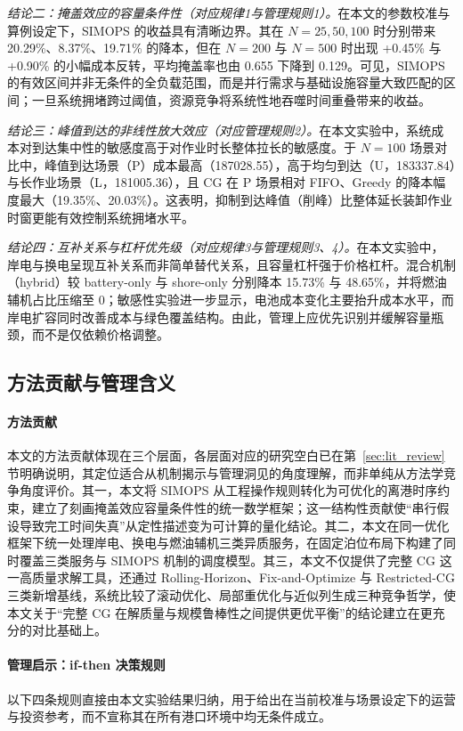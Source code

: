 \documentclass[UTF8, a4paper, 12pt]{ctexart}
\theoremstyle{plain}
\theoremstyle{definition}
\theoremstyle{remark}
\begin{document}
\emph{结论二：掩盖效应的容量条件性（对应规律1与管理规则1）。}在本文的参数校准与算例设定下，SIMOPS 的收益具有清晰边界。其在 $N=25,50,100$ 时分别带来 20.29\%、8.37\%、19.71\% 的降本，但在 $N=200$ 与 $N=500$ 时出现 +0.45\% 与 +0.90\% 的小幅成本反转，平均掩盖率也由 0.655 下降到 0.129。可见，SIMOPS 的有效区间并非无条件的全负载范围，而是并行需求与基础设施容量大致匹配的区间；一旦系统拥堵跨过阈值，资源竞争将系统性地吞噬时间重叠带来的收益。

\emph{结论三：峰值到达的非线性放大效应（对应管理规则2）。}在本文实验中，系统成本对到达集中性的敏感度高于对作业时长整体拉长的敏感度。于 $N=100$ 场景对比中，峰值到达场景（P）成本最高（187028.55），高于均匀到达（U，183337.84）与长作业场景（L，181005.36），且 CG 在 P 场景相对 FIFO、Greedy 的降本幅度最大（19.35\%、20.03\%）。这表明，抑制到达峰值（削峰）比整体延长装卸作业时窗更能有效控制系统拥堵水平。

\emph{结论四：互补关系与杠杆优先级（对应规律3与管理规则3、4）。}在本文实验中，岸电与换电呈现互补关系而非简单替代关系，且容量杠杆强于价格杠杆。混合机制（hybrid）较 battery-only 与 shore-only 分别降本 15.73\% 与 48.65\%，并将燃油辅机占比压缩至 0；敏感性实验进一步显示，电池成本变化主要抬升成本水平，而岸电扩容同时改善成本与绿色覆盖结构。由此，管理上应优先识别并缓解容量瓶颈，而不是仅依赖价格调整。

\subsection{方法贡献与管理含义}
\label{sec:contributions}

\paragraph{方法贡献}
本文的方法贡献体现在三个层面，各层面对应的研究空白已在第~\ref{sec:lit_review} 节明确说明，其定位适合从机制揭示与管理洞见的角度理解，而非单纯从方法学竞争角度评价。其一，本文将 SIMOPS 从工程操作规则转化为可优化的离港时序约束，建立了刻画掩盖效应容量条件性的统一数学框架；这一结构性贡献使“串行假设导致完工时间失真”从定性描述变为可计算的量化结论。其二，本文在同一优化框架下统一处理岸电、换电与燃油辅机三类异质服务，在固定泊位布局下构建了同时覆盖三类服务与 SIMOPS 机制的调度模型。其三，本文不仅提供了完整 CG 这一高质量求解工具，还通过 Rolling-Horizon、Fix-and-Optimize 与 Restricted-CG 三类新增基线，系统比较了滚动优化、局部重优化与近似列生成三种竞争哲学，使本文关于“完整 CG 在解质量与规模鲁棒性之间提供更优平衡”的结论建立在更充分的对比基础上。

\paragraph{管理启示：if-then 决策规则}
以下四条规则直接由本文实验结果归纳，用于给出在当前校准与场景设定下的运营与投资参考，而不宣称其在所有港口环境中均无条件成立。
\end{document}
